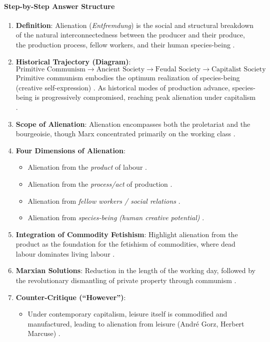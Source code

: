 \paragraph{Step-by-Step Answer Structure}
\begin{enumerate}
    \item \textbf{Definition}: Alienation (\textit{Entfremdung}) is the social and structural breakdown of the natural interconnectedness between the producer and their produce, the production process, fellow workers, and their human species-being .
    \item \textbf{Historical Trajectory (Diagram)}:
    $$\text{Primitive Communism} \longrightarrow \text{Ancient Society} \longrightarrow \text{Feudal Society} \longrightarrow \text{Capitalist Society}$$
    Primitive communism embodies the optimum realization of species-being (creative self-expression) . As historical modes of production advance, species-being is progressively compromised, reaching peak alienation under capitalism .
    \item \textbf{Scope of Alienation}: Alienation encompasses both the proletariat and the bourgeoisie, though Marx concentrated primarily on the working class .
    \item \textbf{Four Dimensions of Alienation}:
    \begin{itemize}
        \item Alienation from the \textit{product} of labour .
        \item Alienation from the \textit{process/act} of production .
        \item Alienation from \textit{fellow workers / social relations} .
        \item Alienation from \textit{species-being (human creative potential)} .
    \end{itemize}
    \item \textbf{Integration of Commodity Fetishism}: Highlight alienation from the product as the foundation for the fetishism of commodities, where dead labour dominates living labour .
    \item \textbf{Marxian Solutions}: Reduction in the length of the working day, followed by the revolutionary dismantling of private property through communism .
    \item \textbf{Counter-Critique (``However'')}:
    \begin{itemize}
        \item Under contemporary capitalism, leisure itself is commodified and manufactured, leading to alienation from leisure (Andr\'e Gorz, Herbert Marcuse) .

\end{itemize}
\end{enumerate}
